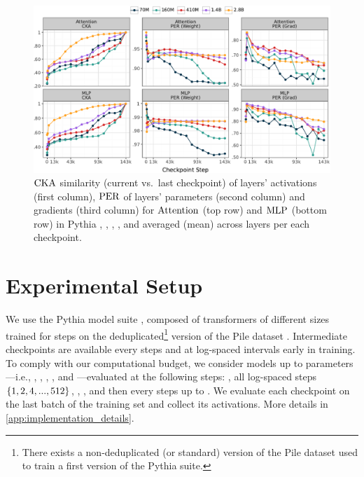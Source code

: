\begin{figure}[h!]
    \centering
    \includegraphics[width=\linewidth]{chapters/tending-towards-stability/figures/results.pdf}
    \vspace{-15pt}
    \caption{$\mathrm{CKA}$ similarity (current vs.\ last checkpoint) of layers' activations (first column), $\mathrm{PER}$ of layers' parameters (second column) and gradients (third column) for $\mathrm{Attention}$ (top row) and $\mathrm{MLP}$ (bottom row) in Pythia \sevenmil, \sixmil, \fourmil, \onebil, and \twobil averaged (mean) across layers per each checkpoint.}
    \label{fig:main-results}
\end{figure}


\section{Experimental Setup}\label{sec:experimental_setup}

We use the Pythia model suite \citep{biderman2023pythia}, composed of  transformers of different sizes trained for  steps on the deduplicated\footnote{There exists a non-deduplicated (or standard) version of the Pile dataset used to train a first version of the Pythia suite.} version of the Pile dataset \citep{gao2020pile}.
Intermediate checkpoints are available every  steps and at log-spaced intervals early in training.
To comply with our computational budget, we consider models up to  parameters---i.e., \sevenmil, \sixmil, \fourmil, \onebil, and \twobil---evaluated at the following steps: , all log-spaced steps $\{1, 2, 4, ..., 512\}$, , , and then every  steps up to .
We evaluate each checkpoint on the last batch of the training set and collect its activations.
More details in \cref{app:implementation_details}.

